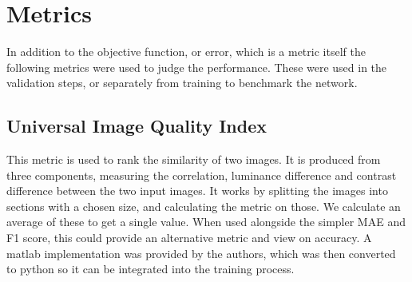 \documentclass[12pt]{report}
\begin{document}
\chapter{Metrics}
In addition to the objective function, or error, which is a metric itself the following metrics were used to judge the performance. These were used in the validation steps, or separately from training to benchmark the network.
\section{Universal Image Quality Index}This metric is used to rank the similarity of two images. It is produced from three components, measuring the correlation, luminance difference and contrast difference between the two input images. It works by splitting the images into sections with a chosen size, and calculating the metric on those. We calculate an average of these to get a single value. When used alongside the simpler MAE and F1 score, this could provide an alternative metric and view on accuracy. A matlab implementation was provided by the authors, which was then converted to python so it can be integrated into the training process.
\end{document}
